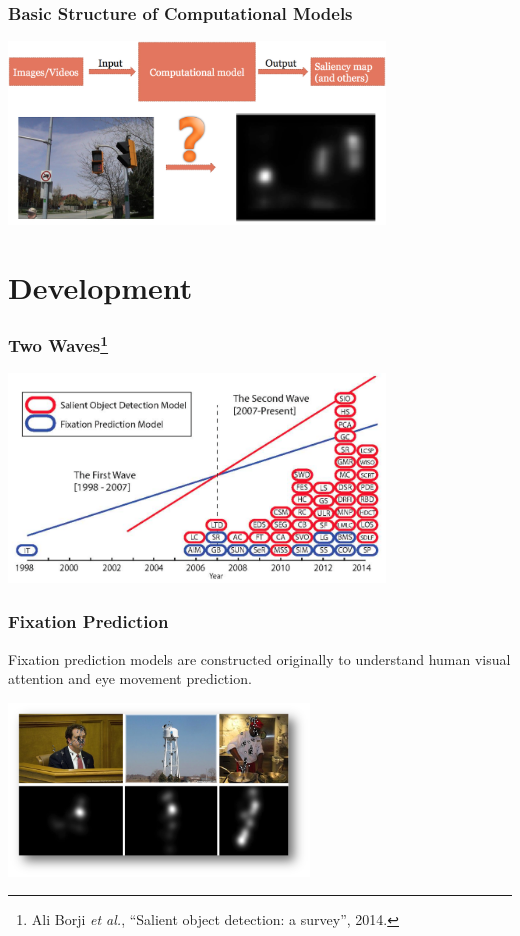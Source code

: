 \documentclass[notheorems,serif,table,compress]{beamer}  %
\begin{document}
\begin{frame}
\frametitle{Basic Structure of Computational Models}
\centering\includegraphics[width=10cm]{BasicStructure.jpg}
\end{frame}


\section{Development}

\begin{frame}
\frametitle{Two Waves\footnote{Ali Borji \textit{et al.}, ``Salient object detection: a survey'', 2014.}}
\centering\includegraphics[width=10cm]{wave}
\end{frame}


\begin{frame}
\frametitle{Fixation Prediction}
Fixation prediction models are constructed originally to understand human visual attention and eye movement prediction.

\centering\includegraphics[width=8cm]{fixationPrediction.png}
\end{frame}
\end{document}
